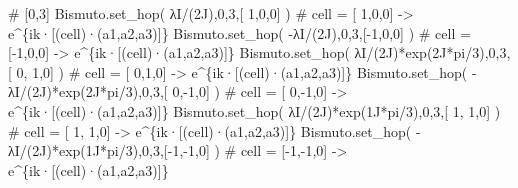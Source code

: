 \documentclass[
  letterpaper,
  DIV=11,
  numbers=noendperiod]{scrreprt}
\newenvironment{Shaded}{\begin{snugshade}}{\end{snugshade}}
\newcommand{\CommentTok}[1]{\textcolor[rgb]{0.37,0.37,0.37}{#1}}
\newcommand{\DecValTok}[1]{\textcolor[rgb]{0.68,0.00,0.00}{#1}}
\newcommand{\NormalTok}[1]{\textcolor[rgb]{0.00,0.23,0.31}{#1}}
\newcommand{\OperatorTok}[1]{\textcolor[rgb]{0.37,0.37,0.37}{#1}}
\newcommand{\OtherTok}[1]{\textcolor[rgb]{0.00,0.23,0.31}{#1}}
\begin{document}
\begin{Shaded}
\begin{Highlighting}[]
\CommentTok{\# [0,3]}
\NormalTok{Bismuto.set\_hop(  λI}\OperatorTok{/}\NormalTok{(}\OtherTok{2J}\NormalTok{),}\DecValTok{0}\NormalTok{,}\DecValTok{3}\NormalTok{,[ }\DecValTok{1}\NormalTok{,}\DecValTok{0}\NormalTok{,}\DecValTok{0}\NormalTok{] ) }\CommentTok{\# cell = [ 1,0,0] {-}\textgreater{} e\^{}\{ik·[(cell)·(a1,a2,a3)]\}}
\NormalTok{Bismuto.set\_hop( }\OperatorTok{{-}}\NormalTok{λI}\OperatorTok{/}\NormalTok{(}\OtherTok{2J}\NormalTok{),}\DecValTok{0}\NormalTok{,}\DecValTok{3}\NormalTok{,[}\OperatorTok{{-}}\DecValTok{1}\NormalTok{,}\DecValTok{0}\NormalTok{,}\DecValTok{0}\NormalTok{] ) }\CommentTok{\# cell = [{-}1,0,0] {-}\textgreater{} e\^{}\{ik·[(cell)·(a1,a2,a3)]\}}
\NormalTok{Bismuto.set\_hop(  λI}\OperatorTok{/}\NormalTok{(}\OtherTok{2J}\NormalTok{)}\OperatorTok{*}\NormalTok{exp(}\OtherTok{2J}\OperatorTok{*}\NormalTok{pi}\OperatorTok{/}\DecValTok{3}\NormalTok{),}\DecValTok{0}\NormalTok{,}\DecValTok{3}\NormalTok{,[ }\DecValTok{0}\NormalTok{, }\DecValTok{1}\NormalTok{,}\DecValTok{0}\NormalTok{] ) }\CommentTok{\# cell = [ 0,1,0] {-}\textgreater{} e\^{}\{ik·[(cell)·(a1,a2,a3)]\}}
\NormalTok{Bismuto.set\_hop( }\OperatorTok{{-}}\NormalTok{λI}\OperatorTok{/}\NormalTok{(}\OtherTok{2J}\NormalTok{)}\OperatorTok{*}\NormalTok{exp(}\OtherTok{2J}\OperatorTok{*}\NormalTok{pi}\OperatorTok{/}\DecValTok{3}\NormalTok{),}\DecValTok{0}\NormalTok{,}\DecValTok{3}\NormalTok{,[ }\DecValTok{0}\NormalTok{,}\OperatorTok{{-}}\DecValTok{1}\NormalTok{,}\DecValTok{0}\NormalTok{] ) }\CommentTok{\# cell = [ 0,{-}1,0] {-}\textgreater{} e\^{}\{ik·[(cell)·(a1,a2,a3)]\}}
\NormalTok{Bismuto.set\_hop(  λI}\OperatorTok{/}\NormalTok{(}\OtherTok{2J}\NormalTok{)}\OperatorTok{*}\NormalTok{exp(}\OtherTok{1J}\OperatorTok{*}\NormalTok{pi}\OperatorTok{/}\DecValTok{3}\NormalTok{),}\DecValTok{0}\NormalTok{,}\DecValTok{3}\NormalTok{,[ }\DecValTok{1}\NormalTok{, }\DecValTok{1}\NormalTok{,}\DecValTok{0}\NormalTok{] ) }\CommentTok{\# cell = [ 1, 1,0] {-}\textgreater{} e\^{}\{ik·[(cell)·(a1,a2,a3)]\}}
\NormalTok{Bismuto.set\_hop( }\OperatorTok{{-}}\NormalTok{λI}\OperatorTok{/}\NormalTok{(}\OtherTok{2J}\NormalTok{)}\OperatorTok{*}\NormalTok{exp(}\OtherTok{1J}\OperatorTok{*}\NormalTok{pi}\OperatorTok{/}\DecValTok{3}\NormalTok{),}\DecValTok{0}\NormalTok{,}\DecValTok{3}\NormalTok{,[}\OperatorTok{{-}}\DecValTok{1}\NormalTok{,}\OperatorTok{{-}}\DecValTok{1}\NormalTok{,}\DecValTok{0}\NormalTok{] ) }\CommentTok{\# cell = [{-}1,{-}1,0] {-}\textgreater{} e\^{}\{ik·[(cell)·(a1,a2,a3)]\}}
\end{Highlighting}
\end{Shaded}
\end{document}
